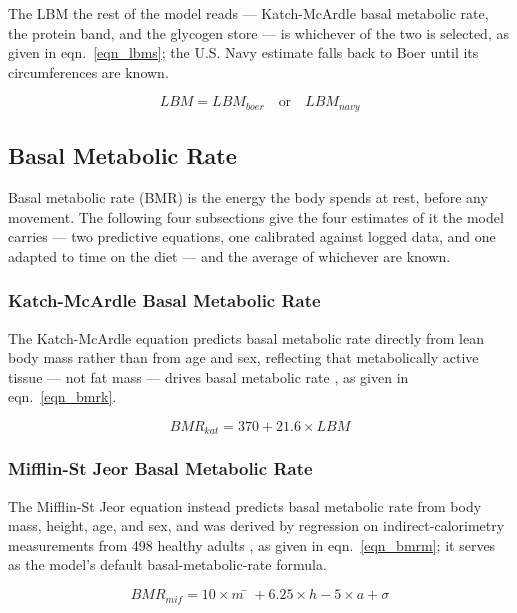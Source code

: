 The LBM the rest of the model reads — Katch-McArdle basal metabolic rate, the protein band, and the glycogen store — is whichever of the two is selected, as given in eqn.~\eqref{eqn_lbms}; the U.S. Navy estimate falls back to Boer until its circumferences are known.

\begin{equation}
\label{eqn_lbms}
LBM = LBM_{boer} \quad \text{or} \quad LBM_{navy}
\end{equation}

\subsection{Basal Metabolic Rate}

Basal metabolic rate (BMR) is the energy the body spends at rest, before any movement. The following four subsections give the four estimates of it the model carries — two predictive equations, one calibrated against logged data, and one adapted to time on the diet — and the average of whichever are known.

\subsubsection{Katch-McArdle Basal Metabolic Rate}

The Katch-McArdle equation predicts basal metabolic rate directly from lean body mass rather than from age and sex, reflecting that metabolically active tissue — not fat mass — drives basal metabolic rate \cite{ref_katch1996}, as given in eqn.~\eqref{eqn_bmrk}.

\begin{equation}
\label{eqn_bmrk}
BMR_{kat} = 370 + 21.6×LBM
\end{equation}

\subsubsection{Mifflin-St Jeor Basal Metabolic Rate}

The Mifflin-St Jeor equation instead predicts basal metabolic rate from body mass, height, age, and sex, and was derived by regression on indirect-calorimetry measurements from 498 healthy adults \cite{ref_mifflin1990}, as given in eqn.~\eqref{eqn_bmrm}; it serves as the model's default basal-metabolic-rate formula.

\begin{equation}
\label{eqn_bmrm}
BMR_{mif} = 10×m̄ + 6.25×h − 5×a + σ
\end{equation}

